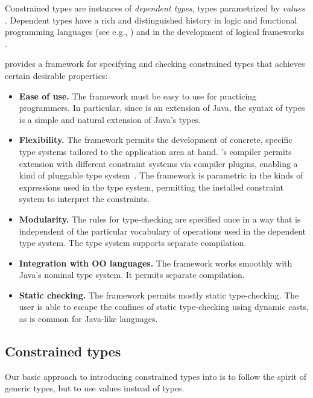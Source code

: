 Constrained types are instances of {\em dependent
types}, types parametrized by {\em values}
\cite{dependent-types}.
Dependent types have a rich and distinguished history in
logic and functional programming languages (see e.g.,
\cite{xi99dependent,ocrz-ecoop03,aspinall-attapl,cayenne,epigram-matter})
and in the development of logical frameworks
\cite{calc-constructions}. 

\Xten{} provides a framework for specifying and checking constrained types
that achieves certain desirable properties:
\begin{itemize}
\item 
{\bf Ease of use.}  The framework must be easy to use for practicing
programmers. In particular, since \Xten{} is an extension of Java,
the syntax of types is a simple and
natural extension of Java's types.

\item
{\bf Flexibility.}
The framework
permits the development of concrete,
specific type systems tailored to the application area at
hand.  \Xten{}'s compiler permits extension with different constraint systems
via compiler plugins, enabling a kind of pluggable type system~\cite{bracha04-pluggable}.
The framework is parametric in the kinds of
expressions used in the type system, permitting the installed constraint
system to interpret the constraints.

\item
{\bf Modularity.}
The rules for type-checking
are specified once in a way that is independent of the
particular vocabulary of operations used in the dependent type
system.
The type system supports separate compilation.

\item
{\bf Integration with OO languages.}
The framework  works smoothly with Java's nominal type system.
It permits separate compilation.

\item
{\bf Static checking.}  The framework permits mostly static
type-checking. The user is able to escape the confines of
static type-checking using dynamic casts, as is common for Java-like
languages.
\end{itemize}

\subsection{Constrained types}

Our basic approach to introducing constrained types into \Xten{}
is to
follow the spirit of generic types, but to use values instead of
types.

